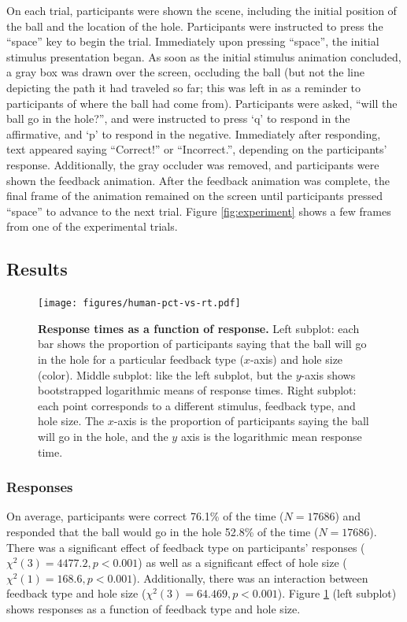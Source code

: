\documentclass[11pt]{article}
\begin{document}
On each trial, participants were shown the scene, including the initial position of the ball and the location of the hole. Participants were instructed to press the ``space'' key to begin the trial. Immediately upon pressing ``space'', the initial stimulus presentation began. As soon as the initial stimulus animation concluded, a gray box was drawn over the screen, occluding the ball (but not the line depicting the path it had traveled so far; this was left in as a reminder to participants of where the ball had come from). Participants were asked, ``will the ball go in the hole?'', and were instructed to press `q' to respond in the affirmative, and `p' to respond in the negative. Immediately after responding, text appeared saying ``Correct!'' or ``Incorrect.'', depending on the participants' response. Additionally, the gray occluder was removed, and participants were shown the feedback animation. After the feedback animation was complete, the final frame of the animation remained on the screen until participants pressed ``space'' to advance to the next trial. Figure \ref{fig:experiment} shows a few frames from one of the experimental trials.

\subsection{Results}

\begin{figure}[t]
    \begin{center}
        \texttt{[image: figures/human-pct-vs-rt.pdf]}
        \caption{\textbf{Response times as a function of response.} Left subplot: each bar shows the proportion of participants saying that the ball will go in the hole for a particular feedback type ($x$-axis) and hole size (color). Middle subplot: like the left subplot, but the $y$-axis shows bootstrapped logarithmic means of response times. Right subplot: each point corresponds to a different stimulus, feedback type, and hole size.  The $x$-axis is the proportion of participants saying the ball will go in the hole, and the $y$ axis is the logarithmic mean response time.}
        \label{fig:pct-vs-rt}
    \end{center}
\end{figure}

\subsubsection{Responses}

On average, participants were correct 76.1\% of the time ($N=17686$) and responded that the ball would go in the hole 52.8\% of the time ($N=17686$). There was a significant effect of feedback type on participants' responses ($\chi^2(3)=4477.2, p<0.001$) as well as a significant effect of hole size ($\chi^2(1)=168.6, p<0.001$). Additionally, there was an interaction between feedback type and hole size ($\chi^2(3)=64.469, p<0.001$). Figure \ref{fig:pct-vs-rt} (left subplot) shows responses as a function of feedback type and hole size.
\end{document}
